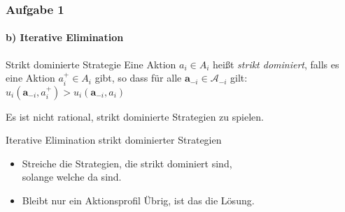 \documentclass{beamer}
\begin{document}
\begin{frame}
	\frametitle{Aufgabe 1}
	\framesubtitle{b) Iterative Elimination}


	\begin{block}{Strikt dominierte Strategie}
		Eine Aktion $a_i \in A_i$ heißt \textit{strikt dominiert}, falls es eine Aktion $a^+_i \in A_i$ gibt, so dass für
		alle $\mathbf{a}_{-i} \in \mathcal{A}_{-i}$ gilt:\\
		\centering
		$u_i(\mathbf{a}_{-i}, a^+_i) > u_i(\mathbf{a}_{-i}, a_i)$
	\end{block}
	Es ist nicht rational, strikt dominierte Strategien zu spielen.


	\begin{block}{Iterative Elimination strikt dominierter Strategien}
		\begin{itemize}
			\item Streiche die Strategien, die strikt dominiert sind,\\ solange welche da sind.
			\item Bleibt nur ein Aktionsprofil Übrig, ist das die Lösung.
		\end{itemize}
	\end{block}

\end{frame}
\end{document}
